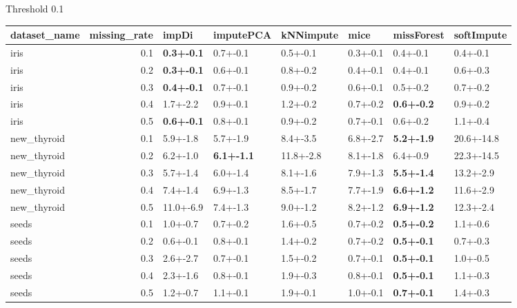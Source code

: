 


 Threshold 0.1 
 \begin{tabular}{lrllllll}
\toprule
dataset_name &  missing_rate &             impDi &         imputePCA & kNNimpute &     mice &        missForest & softImpute \\
\midrule
        iris &           0.1 & \textbf{0.3+-0.1} &          0.7+-0.1 &  0.5+-0.1 & 0.3+-0.1 &          0.4+-0.1 &   0.4+-0.1 \\
        iris &           0.2 & \textbf{0.3+-0.1} &          0.6+-0.1 &  0.8+-0.2 & 0.4+-0.1 &          0.4+-0.1 &   0.6+-0.3 \\
        iris &           0.3 & \textbf{0.4+-0.1} &          0.7+-0.1 &  0.9+-0.2 & 0.6+-0.1 &          0.5+-0.2 &   0.7+-0.2 \\
        iris &           0.4 &          1.7+-2.2 &          0.9+-0.1 &  1.2+-0.2 & 0.7+-0.2 & \textbf{0.6+-0.2} &   0.9+-0.2 \\
        iris &           0.5 & \textbf{0.6+-0.1} &          0.8+-0.1 &  0.9+-0.2 & 0.7+-0.1 &          0.6+-0.2 &   1.1+-0.4 \\
 new_thyroid &           0.1 &          5.9+-1.8 &          5.7+-1.9 &  8.4+-3.5 & 6.8+-2.7 & \textbf{5.2+-1.9} & 20.6+-14.8 \\
 new_thyroid &           0.2 &          6.2+-1.0 & \textbf{6.1+-1.1} & 11.8+-2.8 & 8.1+-1.8 &          6.4+-0.9 & 22.3+-14.5 \\
 new_thyroid &           0.3 &          5.7+-1.4 &          6.0+-1.4 &  8.1+-1.6 & 7.9+-1.3 & \textbf{5.5+-1.4} &  13.2+-2.9 \\
 new_thyroid &           0.4 &          7.4+-1.4 &          6.9+-1.3 &  8.5+-1.7 & 7.7+-1.9 & \textbf{6.6+-1.2} &  11.6+-2.9 \\
 new_thyroid &           0.5 &         11.0+-6.9 &          7.4+-1.3 &  9.0+-1.2 & 8.2+-1.2 & \textbf{6.9+-1.2} &  12.3+-2.4 \\
       seeds &           0.1 &          1.0+-0.7 &          0.7+-0.2 &  1.6+-0.5 & 0.7+-0.2 & \textbf{0.5+-0.2} &   1.1+-0.6 \\
       seeds &           0.2 &          0.6+-0.1 &          0.8+-0.1 &  1.4+-0.2 & 0.7+-0.2 & \textbf{0.5+-0.1} &   0.7+-0.3 \\
       seeds &           0.3 &          2.6+-2.7 &          0.7+-0.1 &  1.5+-0.2 & 0.7+-0.1 & \textbf{0.5+-0.1} &   1.0+-0.5 \\
       seeds &           0.4 &          2.3+-1.6 &          0.8+-0.1 &  1.9+-0.3 & 0.8+-0.1 & \textbf{0.5+-0.1} &   1.1+-0.3 \\
       seeds &           0.5 &          1.2+-0.7 &          1.1+-0.1 &  1.9+-0.1 & 1.0+-0.1 & \textbf{0.7+-0.1} &   1.4+-0.3 \\
\bottomrule
\end{tabular}



